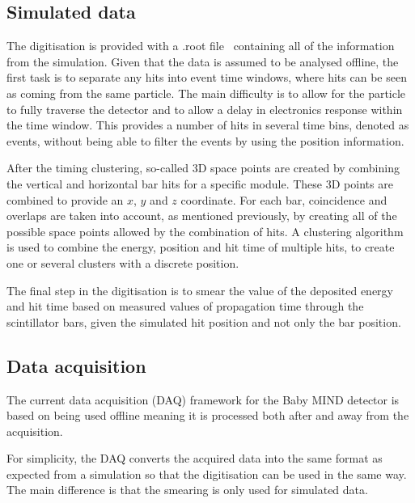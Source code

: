 \subsection{Simulated data}

The digitisation is provided with a .root file~\cite{Root} containing all of the information from the simulation. Given that the data is assumed to be analysed offline, the first task is to separate any hits into event time windows, where hits can be seen as coming from the same particle. The main difficulty is to allow for the particle to fully traverse the detector and to allow a delay in electronics response within the time window. This provides a number of hits in several time bins, denoted as events, without being able to filter the events by using the position information.

After the timing clustering, so-called 3D space points are created by combining the vertical and horizontal bar hits for a specific module. These 3D points are combined to provide an $x$, $y$ and $z$ coordinate. For each bar, coincidence and overlaps are taken into account, as mentioned previously, by creating all of the possible space points allowed by the combination of hits. A clustering algorithm is used to combine the energy, position and hit time of multiple hits, to create one or several clusters with a discrete position.%

The final step in the digitisation is to smear the value of the deposited energy and hit time based on measured values of propagation time through the scintillator bars, given the simulated hit position and not only the bar position.

\subsection{Data acquisition}

The current data acquisition (DAQ) framework for the Baby MIND detector is based on being used offline meaning it is processed both after and away from the acquisition.

For simplicity, the DAQ converts the acquired data into the same format as expected from a simulation so that the digitisation can be used in the same way. The main difference is that the smearing is only used for simulated data.


